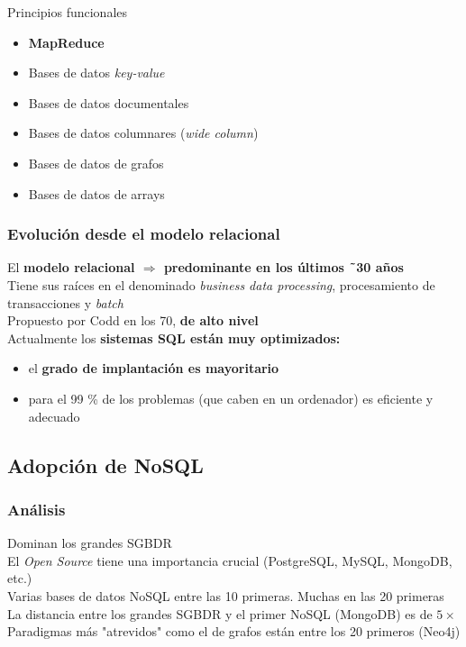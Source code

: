 Principios funcionales
\begin{itemize}
	\item \textbf{MapReduce}
\end{itemize}
\begin{itemize}
\item Bases de datos \textit{key-value}\\
\item Bases de datos documentales\\
\item Bases de datos columnares (\textit{wide column})\\
\item Bases de datos de grafos\\
\item Bases de datos de arrays
\end{itemize}
\subsubsection{Evolución desde el modelo relacional}
El \textbf{modelo relacional $\Rightarrow$ predominante en los últimos ˜30 años}\\
Tiene sus raíces en el denominado \textit{business data processing}, procesamiento de
transacciones y \textit{batch}\\
Propuesto por Codd en los 70, \textbf{de alto nivel}\\
Actualmente los \textbf{sistemas SQL están muy optimizados:}
\begin{itemize}
	\item el \textbf{grado de implantación es mayoritario}
\item para el 99 \% de los problemas (que caben en un ordenador) es eficiente y adecuado
\end{itemize}
\subsection{Adopción de NoSQL}
\subsubsection{Análisis}
Dominan los grandes SGBDR\\
El \textit{Open Source} tiene una importancia crucial (PostgreSQL, MySQL, MongoDB, etc.)\\
Varias bases de datos NoSQL entre las 10 primeras. Muchas en las 20 primeras\\
La distancia entre los grandes SGBDR y el primer NoSQL (MongoDB) es de $5\times$\\
Paradigmas más "atrevidos" como el de grafos están entre los 20 primeros (Neo4j)\\
